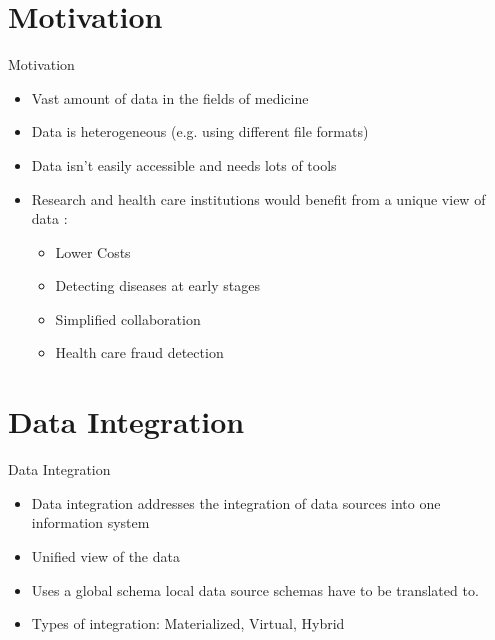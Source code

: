 
\section{Motivation}
\begin{frame}{Motivation}
    \begin{itemize}
    \item Vast amount of data in the fields of medicine
    \item Data is heterogeneous (e.g. using different file formats)
    \item Data isn't easily accessible and needs lots of tools
    
    \item Research and health care institutions would benefit from a unique view of data \cite{Raghupathi2014}:
    \begin{itemize}
    	\item Lower Costs
    	\item Detecting diseases at early stages
    	\item Simplified collaboration
    	\item Health care fraud detection
    \end{itemize}
    \end{itemize}
\end{frame}

\def \data_integration_title{Data Integration}

\section{Data Integration}
\begin{frame}{\data_integration_title}
    \begin{itemize}
    \item Data integration addresses the integration of data sources into one information system \cite{DBLP:books/dp/LeserN2006}
    \item Unified view of the data
    \item Uses a global schema local data source schemas have to be translated to.
    \item Types of integration: Materialized, Virtual, Hybrid

\end{itemize}    
\end{frame}


